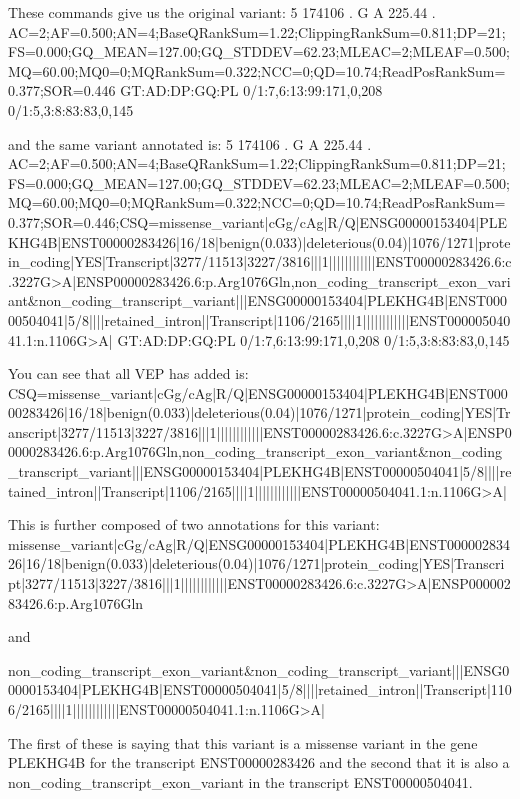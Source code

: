 These commands give us the original variant:
5	174106	.	G	A	225.44	.	AC=2;AF=0.500;AN=4;BaseQRankSum=1.22;ClippingRankSum=0.811;DP=21;FS=0.000;GQ_MEAN=127.00;GQ_STDDEV=62.23;MLEAC=2;MLEAF=0.500;MQ=60.00;MQ0=0;MQRankSum=0.322;NCC=0;QD=10.74;ReadPosRankSum=0.377;SOR=0.446	GT:AD:DP:GQ:PL	0/1:7,6:13:99:171,0,208	0/1:5,3:8:83:83,0,145

and the same variant annotated is:
5	174106	.	G	A	225.44	.	AC=2;AF=0.500;AN=4;BaseQRankSum=1.22;ClippingRankSum=0.811;DP=21;FS=0.000;GQ_MEAN=127.00;GQ_STDDEV=62.23;MLEAC=2;MLEAF=0.500;MQ=60.00;MQ0=0;MQRankSum=0.322;NCC=0;QD=10.74;ReadPosRankSum=0.377;SOR=0.446;CSQ=missense_variant|cGg/cAg|R/Q|ENSG00000153404|PLEKHG4B|ENST00000283426|16/18|benign(0.033)|deleterious(0.04)|1076/1271|protein_coding|YES|Transcript|3277/11513|3227/3816|||1||||||||||||ENST00000283426.6:c.3227G>A|ENSP00000283426.6:p.Arg1076Gln,non_coding_transcript_exon_variant&non_coding_transcript_variant|||ENSG00000153404|PLEKHG4B|ENST00000504041|5/8||||retained_intron||Transcript|1106/2165||||1||||||||||||ENST00000504041.1:n.1106G>A|	GT:AD:DP:GQ:PL	0/1:7,6:13:99:171,0,208	0/1:5,3:8:83:83,0,145

You can see that all VEP has added is:
CSQ=missense_variant|cGg/cAg|R/Q|ENSG00000153404|PLEKHG4B|ENST00000283426|16/18|benign(0.033)|deleterious(0.04)|1076/1271|protein_coding|YES|Transcript|3277/11513|3227/3816|||1||||||||||||ENST00000283426.6:c.3227G>A|ENSP00000283426.6:p.Arg1076Gln,non_coding_transcript_exon_variant&non_coding_transcript_variant|||ENSG00000153404|PLEKHG4B|ENST00000504041|5/8||||retained_intron||Transcript|1106/2165||||1||||||||||||ENST00000504041.1:n.1106G>A|

This is further composed of two annotations for this variant:
missense_variant|cGg/cAg|R/Q|ENSG00000153404|PLEKHG4B|ENST00000283426|16/18|benign(0.033)|deleterious(0.04)|1076/1271|protein_coding|YES|Transcript|3277/11513|3227/3816|||1||||||||||||ENST00000283426.6:c.3227G>A|ENSP00000283426.6:p.Arg1076Gln

and

non_coding_transcript_exon_variant&non_coding_transcript_variant|||ENSG00000153404|PLEKHG4B|ENST00000504041|5/8||||retained_intron||Transcript|1106/2165||||1||||||||||||ENST00000504041.1:n.1106G>A|

The first of these is saying that this variant is a missense variant in the gene PLEKHG4B for the transcript ENST00000283426 and the second that it is also a non_coding_transcript_exon_variant in the transcript ENST00000504041.


